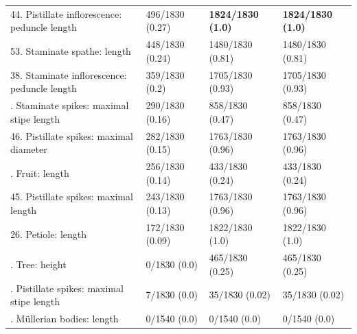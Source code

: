 \documentclass[a4paper]{article}
\theoremstyle{definition}
\theoremstyle{definition}
\theoremstyle{definition}
\theoremstyle{remark}
\begin{document}
\begin{table}[!h]
{\begin{tabular}[t]{>{\raggedright\arraybackslash}p{25em}lll}
\textcolor[HTML]{0a7502}{44. Pistillate inflorescence: peduncle length} & 496/1830 (0.27) & \textcolor[HTML]{0a7502}{\textbf{1824/1830 (1.0)}} & \textcolor[HTML]{0a7502}{\textbf{1824/1830 (1.0)}}\\
\addlinespace
\textcolor[HTML]{0a7502}{53. Staminate spathe: length} & 448/1830 (0.24) & \textcolor[HTML]{0a7502}{1480/1830 (0.81)} & \textcolor[HTML]{0a7502}{1480/1830 (0.81)}\\
\textcolor[HTML]{0a7502}{38. Staminate inflorescence: peduncle length} & 359/1830 (0.2) & \textcolor[HTML]{0a7502}{1705/1830 (0.93)} & \textcolor[HTML]{0a7502}{1705/1830 (0.93)}\\
41. Staminate spikes: maximal stipe length & 290/1830 (0.16) & 858/1830 (0.47) & 858/1830 (0.47)\\
\textcolor[HTML]{0a7502}{46. Pistillate spikes: maximal diameter} & 282/1830 (0.15) & \textcolor[HTML]{0a7502}{1763/1830 (0.96)} & \textcolor[HTML]{0a7502}{1763/1830 (0.96)}\\
55. Fruit: length & 256/1830 (0.14) & 433/1830 (0.24) & 433/1830 (0.24)\\
\addlinespace
\textcolor[HTML]{0a7502}{45. Pistillate spikes: maximal length} & 243/1830 (0.13) & \textcolor[HTML]{0a7502}{1763/1830 (0.96)} & \textcolor[HTML]{0a7502}{1763/1830 (0.96)}\\
\textcolor[HTML]{0a7502}{26. Petiole: length} & 172/1830 (0.09) & \textcolor[HTML]{0a7502}{1822/1830 (1.0)} & \textcolor[HTML]{0a7502}{1822/1830 (1.0)}\\
59. Tree: height & 0/1830 (0.0) & 465/1830 (0.25) & 465/1830 (0.25)\\
47. Pistillate spikes: maximal stipe length & 7/1830 (0.0) & 35/1830 (0.02) & 35/1830 (0.02)\\
02. Müllerian bodies: length & 0/1540 (0.0) & 0/1540 (0.0) & 0/1540 (0.0)\\
\bottomrule
\end{tabular}}
\end{table}

\begingroup\fontsize{8}{10}\selectfont
\end{document}
